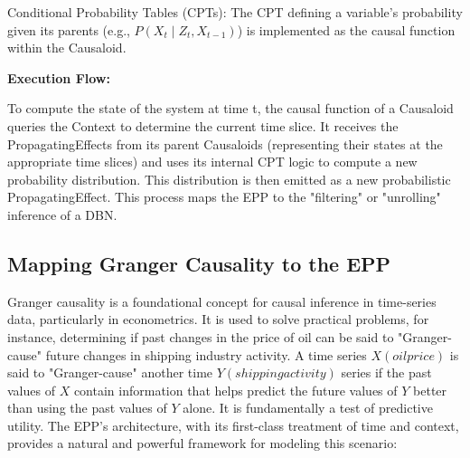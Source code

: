 Conditional Probability Tables (CPTs): The CPT defining a variable's probability given its parents
(e.g., $P(X_t \mid Z_t, X_{t-1})$) is implemented as the causal function within the Causaloid.


\textbf{Execution Flow:}

To compute the state of the system at time t, the causal function of a Causaloid queries the Context to determine the current time slice. It receives the PropagatingEffects from its parent Causaloids (representing their states at the appropriate time slices) and uses its internal CPT logic to compute a new probability distribution. This distribution is then emitted as a new probabilistic PropagatingEffect. This process maps the EPP to the "filtering" or "unrolling" inference of a DBN.
%
%
\subsection{Mapping Granger Causality to the EPP}
\label{sec:epp_Granger_Causality}

Granger causality is a foundational concept for causal inference in time-series data, particularly in econometrics. It is used to solve practical problems, for instance, determining if past changes in the price of oil can be said to "Granger-cause" future changes in shipping industry activity. 
A time series $X(oil price)$ is said to "Granger-cause" another time $Y(shipping activity)$ series if the past values of  $X$ contain information that helps predict the future values of $Y$ 
 better than using the past values of $Y$ alone. It is fundamentally a test of predictive utility. The EPP's architecture, with its first-class treatment of time and context, provides a natural and powerful framework for modeling this scenario:

